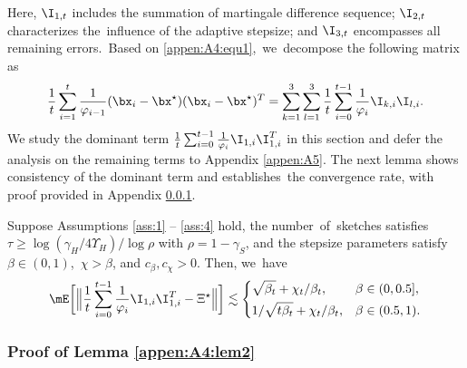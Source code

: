 Here, $\I_{1,t}$ includes the summation of martingale difference sequence; $\I_{2,t}$ characterizes the~influence of the adaptive stepsize; and $\I_{3,t}$ encompasses all remaining errors.~Based on \eqref{appen:A4:equ1},~we~decompose the following matrix as
\begin{equation}\label{appen:A4:equ20}
\frac{1}{t}\sum_{i=1}^t \frac{1}{\varphi_{i-1}}(\bx_i-\bx^\star)(\bx_i-\bx^\star)^T = \sum_{k=1}^3\sum_{l=1}^3\frac{1}{t}\sum_{i=0}^{t -1}\frac{1}{\varphi_i}\I_{k,i}\I_{l,i}.
\end{equation}
We study the dominant term $\frac{1}{t}\sum_{i=0}^{t-1}\frac{1}{\varphi_i}\I_{1,i}\I_{1,i}^T$ in this section and defer the analysis on the remaining terms to Appendix \ref{appen:A5}. The next lemma shows consistency of the dominant term and establishes~the convergence rate, with proof provided in Appendix \ref{pf:I1}.

\begin{lemma}\label{appen:A4:lem2}
Suppose Assumptions \ref{ass:1} -- \ref{ass:4} hold, the \mbox{number}~of~sketches satisfies $\tau\geq \log(\gamma_H/4\Upsilon_H)/\log \rho$ with $\rho = 1-\gamma_S$, and the stepsize parameters satisfy $\beta\in(0,1)$,~$\chi> \beta$, and $c_{\beta}, c_{\chi}>0$. Then, we~have
\begin{equation*}
\mE\bigg[\Big\|\frac{1}{t}\sum_{i=0}^{t-1}\frac{1}{\varphi_i}\I_{1,i}\I_{1,i}^T-\Xi^\star\Big\|\bigg]\lesssim \begin{dcases}
\sqrt{\beta_t} + \chi_t/\beta_t, &\beta\in(0,0.5],\\
1/\sqrt{t\beta_t} + \chi_t/\beta_t, &\beta\in (0.5,1).        
\end{dcases}
\end{equation*} 
\end{lemma}


\subsubsection{Proof of Lemma \ref{appen:A4:lem2}}\label{pf:I1}

